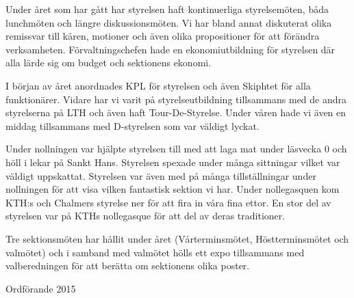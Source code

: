 \documentclass[../_main/handlingar.tex]{subfiles}
\begin{document}

Under året som har gått har styrelsen haft kontinuerliga styrelsemöten, båda lunchmöten och längre diskussionsmöten. Vi har bland annat diskuterat olika remissvar till kåren, motioner och även olika propositioner för att förändra verksamheten. Förvaltningschefen hade en ekonomiutbildning för styrelsen där alla lärde sig om budget och sektionens ekonomi.

I början av året anordnades KPL för styrelsen och även Skiphtet för alla funktionärer. Vidare har vi varit på styrelseutbildning tillsammans med de andra styrelserna på LTH och även haft Tour-De-Styrelse. Under våren hade vi även en middag tillsammans med D-styrelsen som var väldigt lyckat.

Under nollningen var hjälpte styrelsen till med att laga mat under läsvecka 0 och höll i lekar på Sankt Hans. Styrelsen spexade under många sittningar vilket var väldigt uppskattat. Styrelsen var även med på många tillställningar under nollningen för att visa vilken fantastisk sektion vi har. Under nollegasquen kom KTH:s och Chalmers styrelse ner för att fira in våra fina ettor. En stor del av styrelsen var på KTHs nollegasque för att del av deras traditioner.

Tre sektionsmöten har hållit under året (Vårterminsmötet, Höstterminsmötet och valmötet) och i samband med valmötet hölls ett expo tillsammans med valberedningen för att berätta om sektionens olika poster.

\begin{signatures}{1}
    \mvh
    \signature{Hanna Nevalainen}{Ordförande 2015}
\end{signatures}
\end{document}
